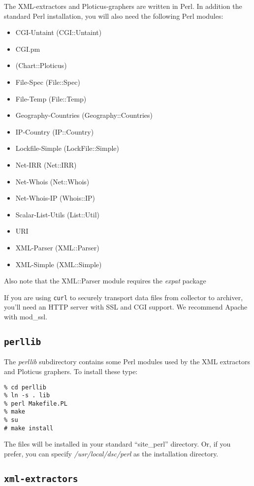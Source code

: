 \documentclass{report}
\begin{document}
The XML-extractors and Ploticus-graphers are written in Perl.  In addition the
standard Perl installation, you will also need the following Perl modules:

\begin{itemize}
	\item CGI-Untaint (CGI::Untaint)
	\item CGI.pm
	\item (Chart::Ploticus)
	\item File-Spec (File::Spec)
	\item File-Temp (File::Temp)
	\item Geography-Countries (Geography::Countries)
	\item IP-Country (IP::Country)
	\item Lockfile-Simple (LockFile::Simple)
	\item Net-IRR (Net::IRR)
	\item Net-Whois (Net::Whois)
	\item Net-Whois-IP (Whois::IP)
	\item Scalar-List-Utils (List::Util)
	\item URI
	\item XML-Parser (XML::Parser)
	\item XML-Simple (XML::Simple)
\end{itemize}

\noindent
Also note that the XML::Parser module requires the {\em expat\/} package

If you are using {\tt curl\/} to securely transport data files from
collector to archiver, you'll need an HTTP server with SSL and CGI support.
We recommend Apache with mod\_ssl.

\subsection{\tt perllib}

The {\em perllib\/} subdirectory contains some Perl modules
used by the XML extractors and Ploticus graphers.  To install
these type:

\begin{verbatim}
% cd perllib
% ln -s . lib
% perl Makefile.PL
% make
% su
# make install
\end{verbatim}

\noindent
The files will be installed in your standard ``site\_perl'' directory.
Or, if you prefer, you can specify {\em /usr/local/dsc/perl\/}
as the installation directory.

\subsection{\tt xml-extractors}
\end{document}
